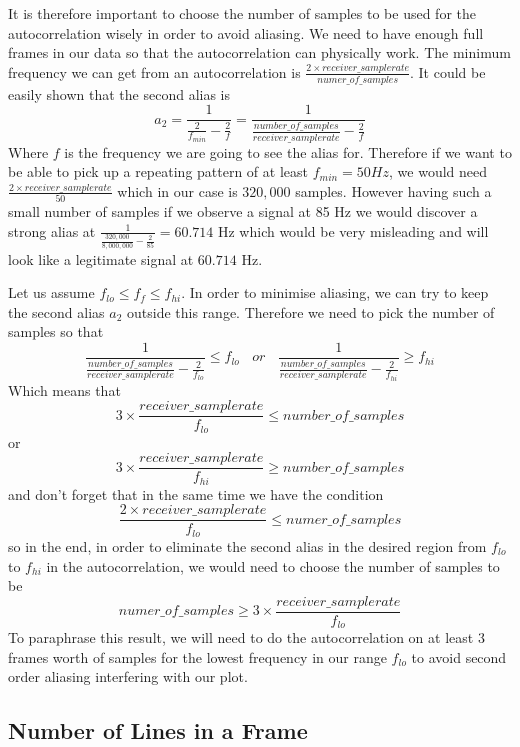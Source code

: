 \documentclass[a4paper,12pt,twoside,openright]{report}
\begin{document}
It is therefore important to choose the number of samples to be used for the autocorrelation wisely in order to avoid aliasing. We need to have enough full frames in our data so that the autocorrelation can physically work. The minimum frequency we can get from an autocorrelation is $\frac{2 \times receiver\_samplerate}{numer\_of\_samples}$. It could be easily shown that the second alias is
\begin{equation}
a_{2} = \frac{1}{\frac{2}{f_{min}}-\frac{2}{f}} = \frac{1}{\frac{number\_of\_samples}{receiver\_samplerate}-\frac{2}{f}}
\end{equation}
Where $f$ is the frequency we are going to see the alias for. Therefore if we want to be able to pick up a repeating pattern of at least $f_{min} = 50 Hz$, we would need $\frac{2 \times receiver\_samplerate}{50}$ which in our case is $320,000$ samples. However having such a small number of samples if we observe a signal at 85 Hz we would discover a strong alias at $\frac{1}{\frac{320,000}{8,000,000}-\frac{2}{85} } = 60.714$ Hz which would be very misleading and will look like a legitimate signal at $60.714$ Hz. 

Let us assume $f_{lo} \leq f_{f} \leq f_{hi}$. In order to minimise aliasing, we can try to keep the second alias $a_{2}$ outside this range. Therefore we need to pick the number of samples so that
$$ \frac{1}{\frac{number\_of\_samples}{receiver\_samplerate}-\frac{2}{f_{lo}}} \leq f_{lo} \,\,\,\,\ or \,\,\,\,\ \frac{1}{\frac{number\_of\_samples}{receiver\_samplerate}-\frac{2}{f_{hi}}} \geq f_{hi} $$
Which means that
$$ 3 \times \frac{receiver\_samplerate}{f_{lo}} \leq number\_of\_samples $$
or
$$3 \times \frac{receiver\_samplerate}{f_{hi}} \geq number\_of\_samples $$
and don't forget that in the same time we have the condition
$$\frac{2 \times receiver\_samplerate}{f_{lo}} \leq numer\_of\_samples$$
so in the end, in order to eliminate the second alias in the desired region from $f_{lo}$ to $f_{hi}$ in the autocorrelation, we would need to choose the number of samples to be
\begin{equation}
\label{eq:autocorraliasingcondition}
numer\_of\_samples \geq 3 \times \frac{receiver\_samplerate}{f_{lo}}
\end{equation}
To paraphrase this result, we will need to do the autocorrelation on at least 3 frames worth of samples for the lowest frequency in our range $f_{lo}$ to avoid second order aliasing interfering with our plot.

\subsection{Number of Lines in a Frame}
\end{document}
